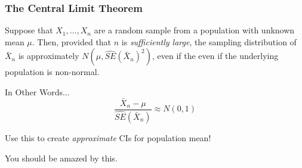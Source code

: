 \documentclass[handout]{beamer}
\begin{document}
\begin{frame}
\frametitle{The Central Limit Theorem}
Suppose that $X_1, \hdots, X_n$ are a random sample from a population with unknown mean $\mu$. Then, provided that $n$ is \alert{\emph{sufficiently large}}, the sampling distribution of $\bar{X}_n$ is approximately $N\left(\mu, \widehat{SE}(\bar{X}_n)^2\right)$, even if the even if the underlying population is \alert{non-normal}.

\begin{block}{In Other Words...}
	$$\frac{\bar{X}_n -\mu}{\widehat{SE}(\bar{X}_n)} \approx N(0,1)$$
\end{block}

\begin{alertblock}{Use this to create \emph{approximate} CIs for population mean!}
\end{alertblock}
\end{frame}
\begin{frame}
\begin{center}\Huge You should be amazed by this.\end{center}
\end{frame}
\end{document}
